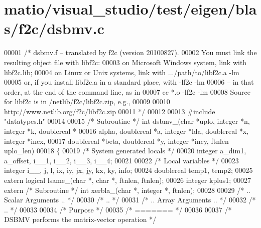 \hypertarget{matio_2visual__studio_2test_2eigen_2blas_2f2c_2dsbmv_8c_source}{}\section{matio/visual\+\_\+studio/test/eigen/blas/f2c/dsbmv.c}
\label{matio_2visual__studio_2test_2eigen_2blas_2f2c_2dsbmv_8c_source}

\begin{DoxyCode}
00001 \textcolor{comment}{/* dsbmv.f -- translated by f2c (version 20100827).}
00002 \textcolor{comment}{   You must link the resulting object file with libf2c:}
00003 \textcolor{comment}{    on Microsoft Windows system, link with libf2c.lib;}
00004 \textcolor{comment}{    on Linux or Unix systems, link with .../path/to/libf2c.a -lm}
00005 \textcolor{comment}{    or, if you install libf2c.a in a standard place, with -lf2c -lm}
00006 \textcolor{comment}{    -- in that order, at the end of the command line, as in}
00007 \textcolor{comment}{        cc *.o -lf2c -lm}
00008 \textcolor{comment}{    Source for libf2c is in /netlib/f2c/libf2c.zip, e.g.,}
00009 \textcolor{comment}{}
00010 \textcolor{comment}{        http://www.netlib.org/f2c/libf2c.zip}
00011 \textcolor{comment}{*/}
00012 
00013 \textcolor{preprocessor}{#include "datatypes.h"}
00014 
00015 \textcolor{comment}{/* Subroutine */} \textcolor{keywordtype}{int} dsbmv\_(\textcolor{keywordtype}{char} *uplo, integer *n, integer *k, doublereal *
00016     alpha, doublereal *a, integer *lda, doublereal *x, integer *incx, 
00017     doublereal *beta, doublereal *y, integer *incy, ftnlen uplo\_len)
00018 \{
00019     \textcolor{comment}{/* System generated locals */}
00020     integer a\_dim1, a\_offset, i\_\_1, i\_\_2, i\_\_3, i\_\_4;
00021 
00022     \textcolor{comment}{/* Local variables */}
00023     integer i\_\_, j, l, ix, iy, jx, jy, kx, ky, info;
00024     doublereal temp1, temp2;
00025     \textcolor{keyword}{extern} logical lsame\_(\textcolor{keywordtype}{char} *, \textcolor{keywordtype}{char} *, ftnlen, ftnlen);
00026     integer kplus1;
00027     \textcolor{keyword}{extern} \textcolor{comment}{/* Subroutine */} \textcolor{keywordtype}{int} xerbla\_(\textcolor{keywordtype}{char} *, integer *, ftnlen);
00028 
00029 \textcolor{comment}{/*     .. Scalar Arguments .. */}
00030 \textcolor{comment}{/*     .. */}
00031 \textcolor{comment}{/*     .. Array Arguments .. */}
00032 \textcolor{comment}{/*     .. */}
00033 
00034 \textcolor{comment}{/*  Purpose */}
00035 \textcolor{comment}{/*  ======= */}
00036 
00037 \textcolor{comment}{/*  DSBMV  performs the matrix-vector  operation */}

\end{DoxyCode}
